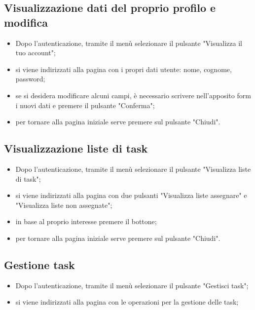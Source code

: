\subsection{Visualizzazione dati del proprio profilo e modifica}
\begin{itemize}
    \item Dopo l'autenticazione, tramite il menù selezionare il pulsante "Visualizza il tuo account";
    \item si viene indirizzati alla pagina con i propri dati utente: nome, cognome, password;
    \item se si desidera modificare alcuni campi, è necessario scrivere nell'apposito form i nuovi dati e premere il pulsante "Conferma";
    \item per tornare alla pagina iniziale serve premere sul pulsante "Chiudi".
\end{itemize}

\subsection{Visualizzazione liste di task}
\begin{itemize}
    \item Dopo l'autenticazione, tramite il menù selezionare il pulsante "Visualizza liste di task";
    \item si viene indirizzati alla pagina con due pulsanti "Visualizza liste assegnare" e "Visualizza liste non assegnate";
    \item in base al proprio interesse premere il bottone;
    \item per tornare alla pagina iniziale serve premere sul pulsante "Chiudi".
\end{itemize}

\subsection{Gestione task}
\begin{itemize}
    \item Dopo l'autenticazione, tramite il menù selezionare il pulsante "Gestisci task";
    \item si viene indirizzati alla pagina con le operazioni per la gestione delle task;
\end{itemize}
